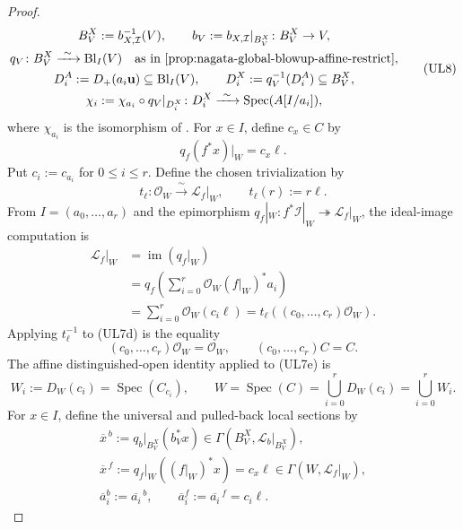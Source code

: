 \begin{proof}
\[\begin{gathered}
    B_V^X:=b_{X,\mathcal I}^{-1}(V),\qquad
    b_V:=b_{X,\mathcal I}|_{B_V^X}\colon B_V^X\to V,\\
    q_V\colon B_V^X\xrightarrow{\ \sim\ }
      \operatorname{Bl}_I(V)
      \quad\text{as in
      \Cref{prop:nagata-global-blowup-affine-restrict}},\\
    D_i^A:=D_+(a_i\mathbf u)\subseteq\operatorname{Bl}_I(V),
    \qquad
    D_i^X:=q_V^{-1}(D_i^A)\subseteq B_V^X,\\
    \chi_i:=\chi_{a_i}\circ q_V|_{D_i^X}\colon
      D_i^X\xrightarrow{\ \sim\ }\operatorname{Spec}(A[I/a_i]),
  \end{gathered}                                               \tag{UL8}
  \]
  where $\chi_{a_i}$ is the isomorphism of
  .
  For $x\in I$, define $c_x\in C$ by
  \[
    q_f(f^*x)|_W=c_x\ell.
  \]
  Put $c_i:=c_{a_i}$ for $0\le i\le r$.
  Define the chosen trivialization by
  \[
    t_\ell\colon\mathcal O_W\xrightarrow{\ \sim\ }\mathcal L_f|_W,
    \qquad t_\ell(r):=r\ell.
  \]
  From $I=(a_0,\ldots,a_r)$ and the epimorphism
  $q_f|_W\colon f^*\mathcal I|_W\twoheadrightarrow\mathcal L_f|_W$, the
  ideal-image computation is
  \[
  \begin{aligned}
    \mathcal L_f|_W
      &=\operatorname{im}(q_f|_W)\\
      &=q_f\!\left(\sum_{i=0}^r
          \mathcal O_W(f|_W)^*a_i\right)\\
      &=\sum_{i=0}^r\mathcal O_W(c_i\ell)
       =t_\ell\!\left((c_0,\ldots,c_r)\mathcal O_W\right).
  \end{aligned}                                                \tag{UL7d}
  \]
  Applying $t_\ell^{-1}$ to (UL7d) is the equality
  \[
    (c_0,\ldots,c_r)\mathcal O_W=\mathcal O_W,
    \qquad (c_0,\ldots,c_r)C=C.                               \tag{UL7e}
  \]
  The affine distinguished-open identity applied to (UL7e) is
  \[
    W_i:=D_W(c_i)=\operatorname{Spec}(C_{c_i}),\qquad
    W=\operatorname{Spec}(C)
      =\bigcup_{i=0}^rD_W(c_i)=\bigcup_{i=0}^rW_i.
  \]
  For $x\in I$, define the universal and pulled-back local sections by
  \[
  \begin{gathered}
    \overline x^{\,b}:=
      q_b|_{B_V^X}(b_V^*x)
      \in\Gamma(B_V^X,\mathcal L_b|_{B_V^X}),\\
    \overline x^{\,f}:=
      q_f|_W((f|_W)^*x)=c_x\ell
      \in\Gamma(W,\mathcal L_f|_W),\\
    \overline a_i^b:=\overline{a_i}^{\,b},\qquad
    \overline a_i^f:=\overline{a_i}^{\,f}=c_i\ell.
  \end{gathered}                                               \tag{UL9}
\]
\end{proof}
